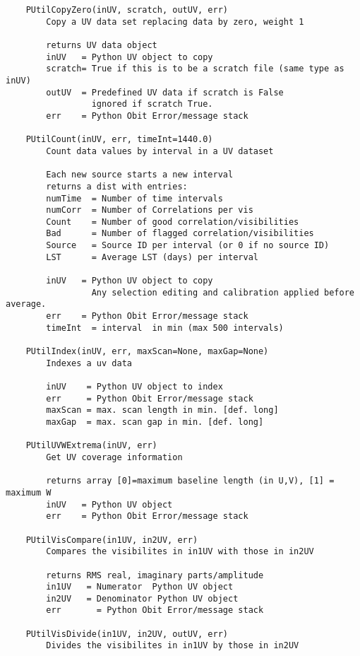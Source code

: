 \documentclass[11pt]{report}
\begin{document}
\begin{verbatim}
    PUtilCopyZero(inUV, scratch, outUV, err)
        Copy a UV data set replacing data by zero, weight 1
        
        returns UV data object
        inUV   = Python UV object to copy
        scratch= True if this is to be a scratch file (same type as inUV)
        outUV  = Predefined UV data if scratch is False
                 ignored if scratch True.
        err    = Python Obit Error/message stack
    
    PUtilCount(inUV, err, timeInt=1440.0)
        Count data values by interval in a UV dataset
        
        Each new source starts a new interval
        returns a dist with entries:
        numTime  = Number of time intervals
        numCorr  = Number of Correlations per vis
        Count    = Number of good correlation/visibilities
        Bad      = Number of flagged correlation/visibilities
        Source   = Source ID per interval (or 0 if no source ID)
        LST      = Average LST (days) per interval
        
        inUV   = Python UV object to copy
                 Any selection editing and calibration applied before average.
        err    = Python Obit Error/message stack
        timeInt  = interval  in min (max 500 intervals)
    
    PUtilIndex(inUV, err, maxScan=None, maxGap=None)
        Indexes a uv data
        
        inUV    = Python UV object to index
        err     = Python Obit Error/message stack
        maxScan = max. scan length in min. [def. long]
        maxGap  = max. scan gap in min. [def. long]
    
    PUtilUVWExtrema(inUV, err)
        Get UV coverage information
        
        returns array [0]=maximum baseline length (in U,V), [1] = maximum W
        inUV   = Python UV object
        err    = Python Obit Error/message stack
    
    PUtilVisCompare(in1UV, in2UV, err)
        Compares the visibilites in in1UV with those in in2UV
        
        returns RMS real, imaginary parts/amplitude
        in1UV   = Numerator  Python UV object
        in2UV   = Denominator Python UV object
        err       = Python Obit Error/message stack
    
    PUtilVisDivide(in1UV, in2UV, outUV, err)
        Divides the visibilites in in1UV by those in in2UV
        

\end{verbatim}
\end{document}
